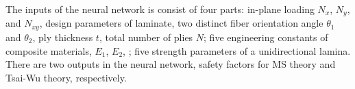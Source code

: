 

The inputs of the neural network is consist of four parts: in-plane loading
$N_x$, $N_y$, and $N_{xy}$, design parameters of laminate, two distinct fiber
orientation angle $\theta_1$ and $\theta_2$, ply thickness $t$, total number of
plies $N$; five engineering constants of composite materials, $E_1$, $E_2$, ;
five strength parameters of a unidirectional lamina. There are two outputs in
the neural network, safety factors for MS theory and Tsai-Wu theory, respectively.






